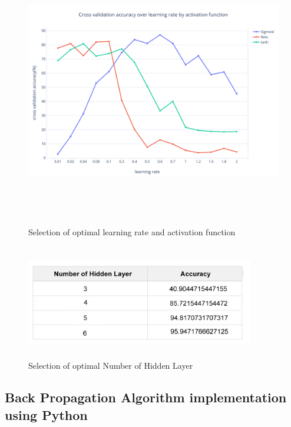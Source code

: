 \begin{figure}[H]
\begin{center}
    
\includegraphics[width=170mm,height=120mm]{dataset_summary/selectionHyperparameter.png}
 \caption{Selection of optimal learning rate and activation function}
 \end{center}                
\end{figure}

\begin{figure}[H]
\begin{center}
    
\includegraphics[width=100mm,height=50mm]{comparison/hiddenlayer.jpg}
 \caption{Selection of optimal Number of Hidden Layer}
 \end{center}                
\end{figure}




\subsection{Back Propagation Algorithm implementation using Python}


